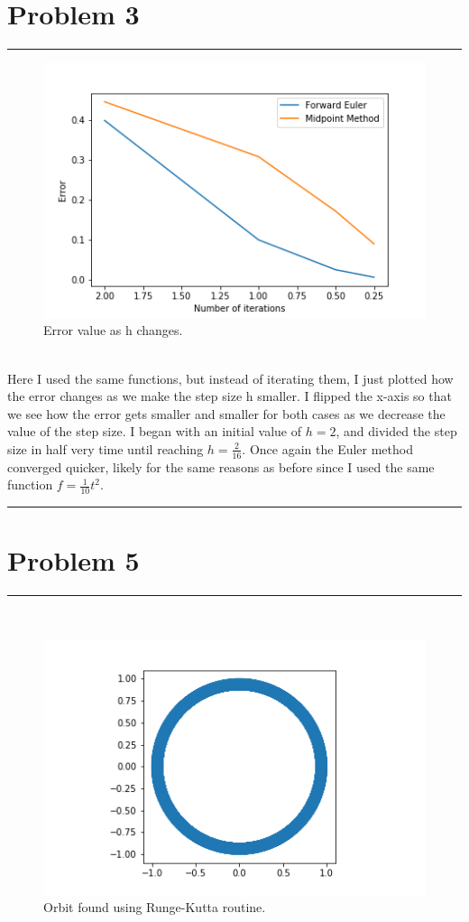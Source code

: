 \documentclass[11pt]{article}
\begin{document}
\section*{\huge Problem 3}
\rule{6.5in}{2pt}

\begin{figure}[hb]
\begin{center}
\includegraphics[scale=.6]{Error2.png}
\end{center}
\caption{Error value as h changes.}
\end{figure}\\

\noindent Here I used the same functions, but instead of iterating them, I just plotted how the error changes as we make the step size h smaller. I flipped the x-axis so that we see how the error gets smaller and smaller for both cases as we decrease the value of the step size. I began with an initial value of $h=2$, and divided the step size in half very time until reaching $h=\frac{2}{16}$. Once again the Euler method converged quicker, likely for the same reasons as before since I used the same function $f= \frac{1}{10} t^{2}$.

\noindent\rule{6.5in}{0.5pt}
\pagebreak

\section*{\huge Problem 5}
\rule{6.5in}{2pt}\\
\begin{figure}[hb]
\begin{center}
\includegraphics[scale=.6]{RKorbit.png}
\end{center}
\caption{Orbit found using Runge-Kutta routine.}
\end{figure}
\end{document}
